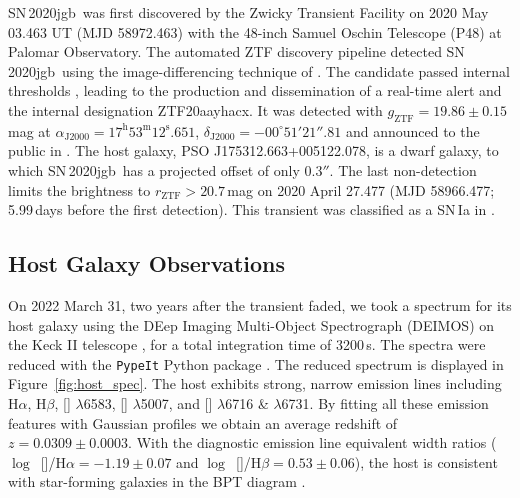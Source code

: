 \documentclass[twocolumn]{aastex631}
\newcommand{\sn}{SN\,2020jgb}
\newcommand{\chang}[1]{\textcolor{blue}{[Chang: #1]}}
\begin{document}
\sn\ was first discovered by the Zwicky Transient Facility \citep[ZTF;][]{ZTF2019a,ZTF2019b} on 2020 May 03.463 UT (MJD 58972.463) with the 48-inch Samuel Oschin Telescope (P48) at Palomar Observatory. The automated ZTF discovery pipeline \citep{Masci_2019} detected \sn\ using the image-differencing technique of \citet{Zackay_imagesub_2016}. The candidate passed internal thresholds \citep[e.g.,][]{Mahabal_ZTFML_2019, Duev_ZTFML_2019}, leading to the production and dissemination of a real-time alert \citep{Patterson_ZTFalert_2019} and the internal designation ZTF20aayhacx. It was detected with $g_\mathrm{ZTF} = 19.86 \pm 0.15\,$mag at $\alpha_\mathrm{J2000}=17^\mathrm{h}53^\mathrm{m}12^\mathrm{s}.651$, $\delta_\mathrm{J2000}=-00^\circ51'21''.81$ and announced to the public in \citet{Fremling_report_2020}. The host galaxy, PSO J175312.663+005122.078, is a dwarf galaxy, to which \sn\ has a projected offset of only $0.3''$. The last non-detection limits the brightness to $r_\mathrm{ZTF} > 20.7$\,mag on 2020 April 27.477 (MJD 58966.477; 5.99\,days before the first detection). This transient was classified as a SN\,Ia in \citet{TNS_2020}.%

\subsection{Host Galaxy Observations}
On 2022 March 31, two years after the transient faded, we took a spectrum for its host galaxy using the DEep Imaging Multi-Object Spectrograph (DEIMOS) on the Keck II telescope \citep{DEIMOS_2003}, for a total integration time of 3200\,s. The spectra were reduced with the \texttt{PypeIt} Python package \citep{pypeit:joss_pub}. The reduced spectrum is displayed in Figure~\ref{fig:host_spec}. The host exhibits strong, narrow emission lines including H$\alpha$, H$\beta$, [] $\lambda$6583, [] $\lambda$5007, and [] $\lambda$6716 \& $\lambda$6731. By fitting all these emission features with Gaussian profiles we obtain an average redshift of $z=0.0309\pm0.0003$. With the diagnostic emission line equivalent width ratios ($\log$~[]/H$\alpha=-1.19\pm0.07$ and $\log$~[]/H$\beta=0.53\pm0.06$), the host is consistent with star-forming galaxies in the BPT diagram \citep{BPT_1981, Veilleux_1987}. 
\end{document}
